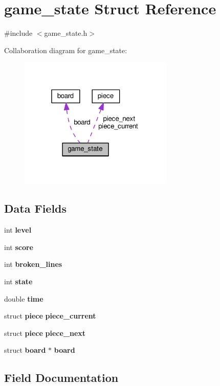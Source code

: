 \section{game\+\_\+state Struct Reference}
\label{structgame__state}


{\ttfamily \#include $<$game\+\_\+state.\+h$>$}



Collaboration diagram for game\+\_\+state\+:
\nopagebreak
\begin{figure}[H]
\begin{center}
\leavevmode
\includegraphics[width=208pt]{structgame__state__coll__graph}
\end{center}
\end{figure}
\subsection*{Data Fields}
\begin{DoxyCompactItemize}
\item 
int \textbf{ level}
\item 
int \textbf{ score}
\item 
int \textbf{ broken\+\_\+lines}
\item 
int \textbf{ state}
\item 
double \textbf{ time}
\item 
struct \textbf{ piece} \textbf{ piece\+\_\+current}
\item 
struct \textbf{ piece} \textbf{ piece\+\_\+next}
\item 
struct \textbf{ board} $\ast$ \textbf{ board}
\end{DoxyCompactItemize}


\subsection{Field Documentation}
\mbox{\label{structgame__state_a6345c25d0d97bb0597ba2541f672dd61}} 
